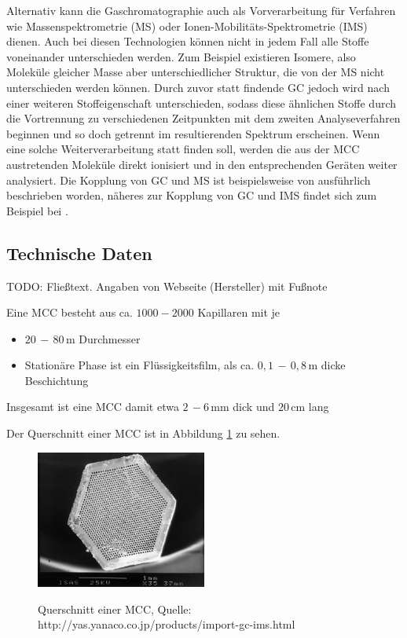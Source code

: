 Alternativ kann die Gaschromatographie auch als Vorverarbeitung für Verfahren wie Massenspektrometrie (MS) oder Ionen-Mobilitäts-Spektrometrie (IMS) dienen. Auch bei diesen Technologien können nicht in jedem Fall alle Stoffe voneinander unterschieden werden. Zum Beispiel existieren Isomere, also Moleküle gleicher Masse aber unterschiedlicher Struktur, die von der MS nicht unterschieden werden können. Durch zuvor statt findende GC jedoch wird nach einer weiteren Stoffeigenschaft unterschieden, sodass diese ähnlichen Stoffe durch die Vortrennung zu verschiedenen Zeitpunkten mit dem zweiten Analyseverfahren beginnen und so doch getrennt im resultierenden Spektrum erscheinen. Wenn eine solche Weiterverarbeitung statt finden soll, werden die aus der MCC austretenden Moleküle direkt ionisiert und in den entsprechenden Geräten weiter analysiert.
Die Kopplung von GC und MS ist beispielsweise von \cite{Hubschmann2009} ausführlich beschrieben worden, näheres zur Kopplung von GC und IMS findet sich zum Beispiel bei \citep{Baumbach2009}. 


\subsection{Technische Daten}
TODO: Fließtext. 
Angaben von Webseite (Hersteller) mit Fußnote

Eine MCC besteht aus ca. $1000 - 2000$ Kapillaren mit je
\begin{itemize}
 \item $20\,-\,80$\,\textmu m Durchmesser
 \item Stationäre Phase ist ein Flüssigkeitsfilm, als ca. $0,1\,-\,0,8$\,\textmu m dicke Beschichtung
\end{itemize}
Insgesamt ist eine MCC damit etwa $2\,-6$\,mm dick und $20$\,cm lang


Der Querschnitt einer MCC ist in Abbildung \ref{MCC} zu sehen.

\begin{figure}
 \centering
  \includegraphics[width = 0.5\textwidth]{bilder/MultiCapillaryColumn}\\
  \caption[Querschnitt einer MCC]{Querschnitt einer MCC, Quelle: http://yas.yanaco.co.jp/products/import-gc-ims.html}
  \label{MCC}
\end{figure}

